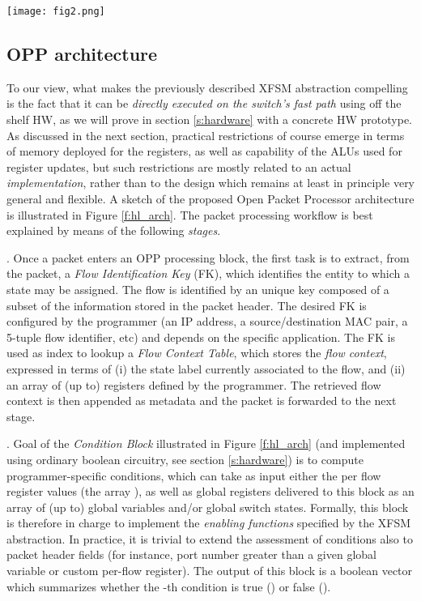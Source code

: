 \documentclass{sig-alternate}
\begin{document}
\begin{figure*}[t]
	\centering
	\texttt{[image: fig2.png]} 
		  \vspace{-2em}
	\caption{OPP architecture}
		  \vspace{-1em}
	\label{f:hl_arch}
\end{figure*}

\subsection{OPP architecture}
\label{ss:arch}

To our view, what makes the previously described XFSM abstraction compelling is the fact that it can be {\em directly executed on the switch's fast path} using off the shelf HW, as we will prove in section \ref{s:hardware} with a concrete HW prototype. As discussed in the next section, practical restrictions of course emerge in terms of memory deployed for the registers, as well as capability of the ALUs used for register updates, but such restrictions are mostly related to an actual {\em  implementation}, rather than to the design which remains at least in principle very general and flexible. A sketch of the proposed Open Packet Processor architecture is illustrated in Figure \ref{f:hl_arch}. The packet processing workflow is best explained by means of the following {\em stages}.

\vspace{3pt} . Once a packet enters an OPP processing block, the first task is to extract, from the packet, a {\em Flow Identification Key} (FK), which identifies the entity to which a state may be assigned. The flow is identified by an unique key composed of a subset of the information stored in the packet header. The desired FK is configured by the programmer  (an IP address, a source/destination MAC pair, a 5-tuple flow identifier, etc) and depends on the specific application. The FK is used as index to lookup a {\em Flow Context Table}, which stores the {\em flow context}, expressed in terms of (i) the state label  currently associated to the flow, and (ii) an array  of (up to)  registers defined by the programmer. The retrieved flow context is then appended as metadata and the packet is forwarded to the next stage.

\vspace{3pt} . Goal of the {\em Condition Block} illustrated in Figure \ref{f:hl_arch} (and implemented using ordinary boolean circuitry, see section \ref{s:hardware}) is to compute programmer-specific conditions, which can take as input either the per flow register values (the array ), as well as global registers delivered to this block as an array  of (up to)  global variables and/or global switch states. Formally, this block is therefore in charge to implement the {\em enabling functions} specified by the XFSM abstraction. In practice, it is trivial to extend the assessment of conditions also to packet header fields (for instance, port number greater than a given global variable or custom per-flow register). The output of this block is a boolean vector  which summarizes whether  the -th condition is true () or false (). 
\end{document}
